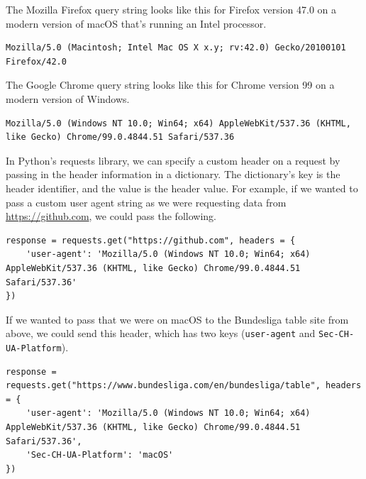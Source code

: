 The Mozilla Firefox query string looks like this for Firefox version 47.0 on a modern version of macOS that's running an Intel processor.\par
\begin{lstlisting}[style=none]
Mozilla/5.0 (Macintosh; Intel Mac OS X x.y; rv:42.0) Gecko/20100101 Firefox/42.0
\end{lstlisting}
The Google Chrome query string looks like this for Chrome version 99 on a modern version of Windows.\par
\begin{lstlisting}[style=none]
Mozilla/5.0 (Windows NT 10.0; Win64; x64) AppleWebKit/537.36 (KHTML, like Gecko) Chrome/99.0.4844.51 Safari/537.36
\end{lstlisting}
In Python's requests library, we can specify a custom header on a request by passing in the header information in a dictionary. The dictionary's key is the header identifier, and the value is the header value. For example, if we wanted to pass a custom user agent string as we were requesting data from \href{https://github.com}{https://github.com}, we could pass the following.\par
\begin{lstlisting}[style=pippython]
response = requests.get("https://github.com", headers = {
	'user-agent': 'Mozilla/5.0 (Windows NT 10.0; Win64; x64) AppleWebKit/537.36 (KHTML, like Gecko) Chrome/99.0.4844.51 Safari/537.36'
})
\end{lstlisting}
If we wanted to pass that we were on macOS to the Bundesliga table site from above, we could send this header, which has two keys (\verb|user-agent| and \verb|Sec-CH-UA-Platform|).
\begin{lstlisting}[style=pippython]
response = requests.get("https://www.bundesliga.com/en/bundesliga/table", headers = {
	'user-agent': 'Mozilla/5.0 (Windows NT 10.0; Win64; x64) AppleWebKit/537.36 (KHTML, like Gecko) Chrome/99.0.4844.51 Safari/537.36',
	'Sec-CH-UA-Platform': 'macOS'
})
\end{lstlisting}
